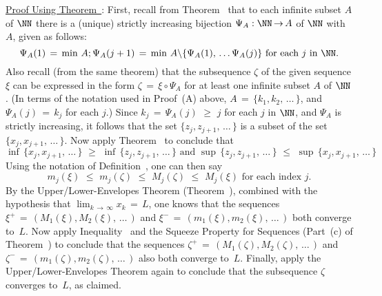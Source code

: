 \V

        \underline{Proof Using Theorem~}: First, recall from Theorem~ that to each infinite subset $A$ of ${\NN}$ there is a (unique) strictly increasing bijection ${\Psi}_{A}:{\NN} \,{\rightarrow}\, A$ of ${\NN}$ with $A$, given as follows:
        \begin{displaymath}
        {\Psi}_{A}(1) \,=\, \min\,A; {\Psi}_{A}(j+1) \,=\, \min\,A{\setminus}
    \{ {\Psi}_{A}(1),\,{\ldots}\,{\Psi}_{A}(j)\} \mbox{ for each $j$ in ${\NN}$}.
        \end{displaymath}
    Also recall (from the same theorem) that the subsequence ${\zeta}$ of the given sequence ${\xi}$ can be expressed in the form ${\zeta} \,=\, {\xi}{\circ}{\Psi}_{A}$ for at least one infinite subset $A$ of ${\NN}$.
    (In terms of the notation used in Proof~(A) above, $A \,=\, \{k_{1},k_{2},\,{\ldots}\,\}$, and ${\Psi}_{A}(j) \,=\, k_{j}$ for each $j$.)
    Since $k_{j} \,=\, {\Psi}_{A}(j)\,\,{\geq}\,\,j$ for each $j$ in ${\NN}$, and ${\Psi}_{A}$ is strictly increasing,
    it follows that the set $\{z_{j},z_{j+1},\,{\ldots}\,\}$ is a subset of the set $\{x_{j},x_{j+1},\,{\ldots}\,\}$.
Now apply Theorem~ to conclude that
        \begin{displaymath}
        {\inf}\,\{x_{j},x_{j+1},\,{\ldots}\,\} \,\,{\geq}\,\, 
        {\inf}\,\{z_{j},z_{j+1},\,{\ldots}\,\} \mbox{ and }
        {\sup}\,\{z_{j},z_{j+1},\,{\ldots}\,\} \,\,{\leq}\,\, 
        {\sup}\,\{x_{j},x_{j+1},\,{\ldots}\,\}
        \end{displaymath}
    Using the notation of Definition~, one can then say
        \begin{equation} 
        \label{IneqC.50}
        m_{j}({\xi})\,\,{\leq}\,\,m_{j}({\zeta})
    \,\,{\leq}\,\,
        M_{j}({\zeta})\,\,{\leq}\,\,M_{j}({\xi}) \mbox{ for each index $j$}.
        \end{equation}
    By the Upper/Lower-Envelopes Theorem (Theorem~), combined with the hypothesis that $\lim_{k \,{\rightarrow}\, {\infty}} x_{k} \,=\, L$, one knows that the sequences ${\xi}^{+} \,=\, (M_{1}({\xi}),M_{2}({\xi}),\,{\ldots}\,)$ and ${\xi}^{-} \,=\, (m_{1}({\xi}),m_{2}({\xi}),\,{\ldots}\,)$ both converge to~$L$.
    Now apply Inequality~ and the Squeeze Property for Sequences (Part~(c) of Theorem~) to conclude that the sequences ${\zeta}^{+} \,=\, (M_{1}({\zeta}),M_{2}({\zeta}),\,{\ldots}\,)$ and ${\zeta}^{-} \,=\, (m_{1}({\zeta}),m_{2}({\zeta}),\,{\ldots}\,)$ also both converge to~$L$.
    Finally, apply the Upper/Lower-Envelopes Theorem again to conclude that the subsequence ${\zeta}$ converges to~$L$, as claimed.



